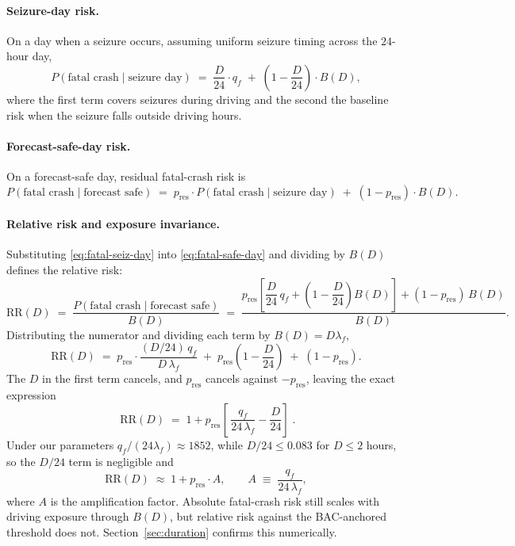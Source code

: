 \documentclass[11pt]{article}
\numberwithin{equation}{section}
\newcommand{\pres}{p_{\mathrm{res}}}
\begin{document}
\paragraph{Seizure-day risk.}
On a day when a seizure occurs, assuming uniform seizure timing across the $24$-hour
day,
\begin{equation}
P(\text{fatal crash} \mid \text{seizure day})
\;=\; \frac{D}{24}\cdot q_f \;+\; \left(1 - \frac{D}{24}\right)\cdot B(D),
\label{eq:fatal-seiz-day}
\end{equation}
where the first term covers seizures during driving and the second the baseline risk
when the seizure falls outside driving hours.

\paragraph{Forecast-safe-day risk.}
On a forecast-safe day, residual fatal-crash risk is
\begin{equation}
P(\text{fatal crash} \mid \text{forecast safe})
\;=\; \pres \cdot P(\text{fatal crash} \mid \text{seizure day})
\;+\; (1 - \pres)\cdot B(D).
\label{eq:fatal-safe-day}
\end{equation}

\paragraph{Relative risk and exposure invariance.}
Substituting \eqref{eq:fatal-seiz-day} into \eqref{eq:fatal-safe-day} and dividing by
$B(D)$ defines the relative risk:
\begin{equation}
\mathrm{RR}(D)
\;=\; \frac{P(\text{fatal crash} \mid \text{forecast safe})}{B(D)}
\;=\; \frac{\pres\!\left[\dfrac{D}{24}\,q_f + \left(1 - \dfrac{D}{24}\right)B(D)\right]
            + (1 - \pres)\,B(D)}{B(D)}.
\label{eq:rr-defn}
\end{equation}
Distributing the numerator and dividing each term by $B(D) = D\lambda_f$,
\begin{equation}
\mathrm{RR}(D)
\;=\; \pres \cdot \frac{(D/24)\,q_f}{D\,\lambda_f}
\;+\; \pres\!\left(1 - \frac{D}{24}\right)
\;+\; (1 - \pres).
\label{eq:rr-step1}
\end{equation}
The $D$ in the first term cancels, and $\pres$ cancels against $-\pres$, leaving the
exact expression
\begin{equation}
\boxed{\;
\mathrm{RR}(D)
\;=\; 1 + \pres\!\left[\,\frac{q_f}{24\,\lambda_f} - \frac{D}{24}\right]\;}.
\label{eq:rr-exact}
\end{equation}
Under our parameters $q_f/(24\lambda_f) \approx 1852$, while $D/24 \le 0.083$ for
$D \le 2$ hours, so the $D/24$ term is negligible and
\begin{equation}
\mathrm{RR}(D)
\;\approx\; 1 + \pres \cdot A,
\qquad
A \;\equiv\; \frac{q_f}{24\,\lambda_f},
\label{eq:rr-approx}
\end{equation}
where $A$ is the amplification factor. Absolute fatal-crash risk still scales with
driving exposure through $B(D)$, but relative risk against the BAC-anchored threshold
does not. Section~\ref{sec:duration} confirms this numerically.
\end{document}
